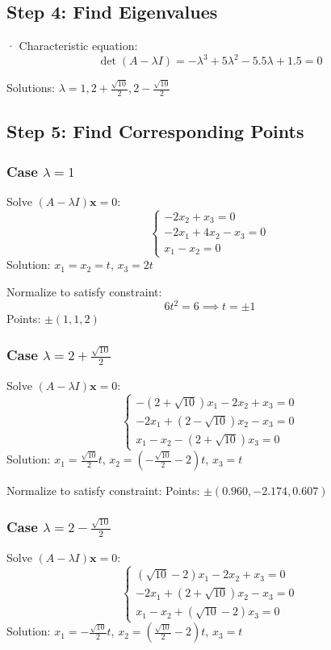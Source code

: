 \documentclass{article}
\begin{document}
\subsection*{Step 4: Find Eigenvalues}  ·
Characteristic equation:
\[ \det(A - \lambda I) = -\lambda^{3} + 5\lambda^{2} - 5.5\lambda + 1.5 = 0 \]

Solutions: $\lambda = 1, 2+\frac{\sqrt{10}}{2}, 2-\frac{\sqrt{10}}{2}$

\subsection*{Step 5: Find Corresponding Points}
\subsubsection*{Case $\lambda = 1$}
Solve $(A - \lambda I)\mathbf{x} = 0$:
\[ \begin{cases}
-2x_2 + x_3 = 0 \\
-2x_1 + 4x_2 - x_3 = 0 \\
x_1 - x_2 = 0
\end{cases} \]
Solution: $x_1 = x_2 = t$, $x_3 = 2t$

Normalize to satisfy constraint:
\[ 6t^2 = 6 \implies t = \pm 1 \]
Points: $\pm(1, 1, 2)$

\subsubsection*{Case $\lambda = 2+\frac{\sqrt{10}}{2}$}
Solve $(A - \lambda I)\mathbf{x} = 0$:
\[ \begin{cases}
-(2+\sqrt{10})x_1 - 2x_2 + x_3 = 0 \\
-2x_1 +(2-\sqrt{10})x_2 - x_3 = 0 \\
x_1 - x_2 - (2+\sqrt{10})x_3 = 0
\end{cases} \]
Solution: $x_1 = \frac{\sqrt{10}}{2}t$, $x_2 = (-\frac{\sqrt{10}}{2}-2)t$, $x_3 = t$

Normalize to satisfy constraint:
Points: $\pm(0.960, -2.174, 0.607)$

\subsubsection*{Case $\lambda = 2-\frac{\sqrt{10}}{2}$}
Solve $(A - \lambda I)\mathbf{x} = 0$:
\[ \begin{cases}
(\sqrt{10}-2)x_1 - 2x_2 + x_3 = 0 \\
-2x_1 +(2+\sqrt{10})x_2 - x_3 = 0 \\
x_1 - x_2 +(\sqrt{10}-2)x_3 = 0
\end{cases} \]
Solution: $x_1 = -\frac{\sqrt{10}}{2}t$, $x_2 = (\frac{\sqrt{10}}{2}-2)t$, $x_3 = t$
\end{document}

